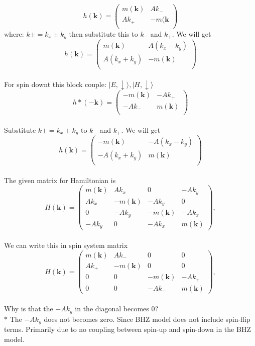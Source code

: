\documentclass[a4paper,12pt]{article}
\begin{document}
\begin{enumerate}
\[ h(\mathbf{k}) = \begin{pmatrix}
 m(\mathbf{k}) & A k_- \\
 A k_+ & -m(\mathbf{k} \\
\end{pmatrix}\]
where: $k\pm = k_x \pm k_y$ then substitute this to $k_- $ and $k_+$. We will get\\
\[ h(\mathbf{k}) = \begin{pmatrix}
 m(\mathbf{k}) & A (k_x - k_y)\\
 A (k_x + k_y) & -m(\mathbf{k}) \\
\end{pmatrix}\]\\
For spin downt this block couple: $\vert E, \downarrow \rangle, \vert H, \downarrow \rangle$\\
\[ h\ast(\mathbf{-k}) = \begin{pmatrix}
 -m(\mathbf{k}) & -A k_+\\
 -A k_- & m(\mathbf{k}) \\
\end{pmatrix}\]\\
Substitute  $k\pm = k_x \pm k_y$ to $k_- $ and $k_+$. We will get\\
\[ h(\mathbf{k}) = \begin{pmatrix}
 -m(\mathbf{k}) & -A (k_x - k_y)\\
 -A (k_x + k_y) & m(\mathbf{k}) \\
\end{pmatrix}\]\\
The given matrix for Hamiltonian is\\
    \[
    H(\mathbf{k}) = \begin{pmatrix}
    m(\mathbf{k}) & A k_x & 0 & -A k_y \\
    A k_x & -m(\mathbf{k}) & -A k_y & 0 \\
    0 & -A k_y & -m(\mathbf{k}) & -A k_x \\
    -A k_y & 0 & -A k_x & m(\mathbf{k})
    \end{pmatrix},
    \]\\
We can write this in spin system matrix\\
    \[
    H(\mathbf{k}) = \begin{pmatrix}
    m(\mathbf{k}) & A k_- & 0 & 0 \\
    A k_+ & -m(\mathbf{k}) & 0 & 0 \\
    0 & 0 & -m(\mathbf{k}) & -A k_+ \\
  0 & 0 & -A k_- & m(\mathbf{k})
    \end{pmatrix},
    \]\\
Why is that the $-A k_y$ in the diagonal becomes 0?\\
$\ast$ The $-A k_y$ does not becomes zero. Since BHZ model does not include spin-flip terms. Primarily due to no coupling between spin-up and spin-down in the BHZ model.


\end{enumerate}
\end{document}
